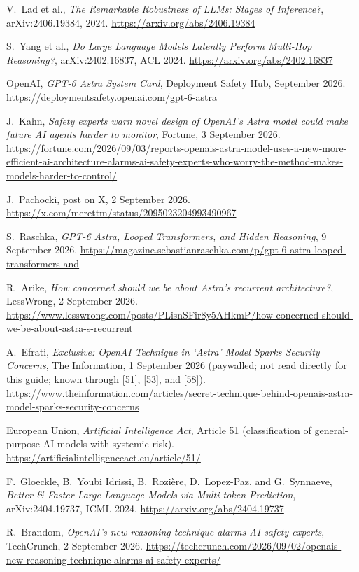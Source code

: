 \documentclass[11pt,letterpaper]{article}
\begin{document}
\begin{enumerate}[label={\textcolor{deepindigo}{[\arabic*]}}, leftmargin=2.6em, itemsep=0.3em]
  \item V.~Lad et al., \emph{The Remarkable Robustness of LLMs: Stages of Inference?}, arXiv:2406.19384, 2024. \url{https://arxiv.org/abs/2406.19384}
  \item S.~Yang et al., \emph{Do Large Language Models Latently Perform Multi-Hop Reasoning?}, arXiv:2402.16837, ACL 2024. \url{https://arxiv.org/abs/2402.16837}
  \item OpenAI, \emph{GPT-6 Astra System Card}, Deployment Safety Hub, September 2026. \url{https://deploymentsafety.openai.com/gpt-6-astra}
  \item J.~Kahn, \emph{Safety experts warn novel design of OpenAI's Astra model could make future AI agents harder to monitor}, Fortune, 3 September 2026. \url{https://fortune.com/2026/09/03/reports-openais-astra-model-uses-a-new-more-efficient-ai-architecture-alarms-ai-safety-experts-who-worry-the-method-makes-models-harder-to-control/}
  \item J.~Pachocki, post on X, 2 September 2026. \url{https://x.com/merettm/status/2095023204993490967}
  \item S.~Raschka, \emph{GPT-6 Astra, Looped Transformers, and Hidden Reasoning}, 9 September 2026. \url{https://magazine.sebastianraschka.com/p/gpt-6-astra-looped-transformers-and}
  \item R.~Arike, \emph{How concerned should we be about Astra's recurrent architecture?}, LessWrong, 2 September 2026. \url{https://www.lesswrong.com/posts/PLisnSFir8y5AHkmP/how-concerned-should-we-be-about-astra-s-recurrent}
  \item A.~Efrati, \emph{Exclusive: OpenAI Technique in `Astra' Model Sparks Security Concerns}, The Information, 1 September 2026 (paywalled; not read directly for this guide; known through [51], [53], and [58]). \url{https://www.theinformation.com/articles/secret-technique-behind-openais-astra-model-sparks-security-concerns}
  \item European Union, \emph{Artificial Intelligence Act}, Article 51 (classification of general-purpose AI models with systemic risk). \url{https://artificialintelligenceact.eu/article/51/}
  \item F.~Gloeckle, B.~Youbi Idrissi, B.~Rozi\`ere, D.~Lopez-Paz, and G.~Synnaeve, \emph{Better \& Faster Large Language Models via Multi-token Prediction}, arXiv:2404.19737, ICML 2024. \url{https://arxiv.org/abs/2404.19737}
  \item R.~Brandom, \emph{OpenAI's new reasoning technique alarms AI safety experts}, TechCrunch, 2 September 2026. \url{https://techcrunch.com/2026/09/02/openais-new-reasoning-technique-alarms-ai-safety-experts/}

\end{enumerate}
\end{document}
